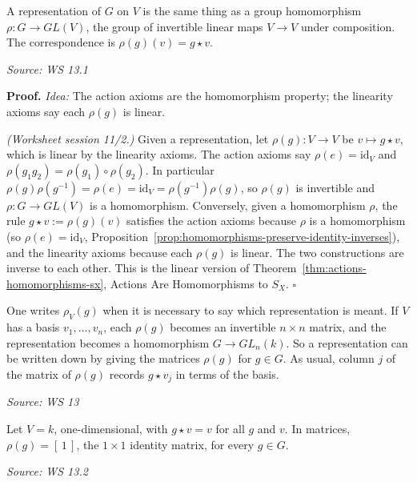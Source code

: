 \documentclass[11pt]{report}
\renewenvironment{proof}[1][Proof]{\noindent\textbf{#1.} }{\hfill$\square$\par\vspace{5pt}}
\newcommand{\srcline}[1]{\par\hfill{\footnotesize\textit{Source: #1}}}
\begin{document}
\begin{propbox}\label{prop:representations-homomorphisms-glv}
A representation of $G$ on $V$ is the same thing as a group homomorphism $\rho: G \to GL(V)$, the group of invertible linear maps $V \to V$ under composition. The correspondence is $\rho(g)(v) = g \star v$.
\srcline{WS 13.1}
\end{propbox}

\begin{proof}
\textit{Idea:} The action axioms are the homomorphism property; the linearity axioms say each $\rho(g)$ is linear.\par
\textit{(Worksheet session 11/2.)} Given a representation, let $\rho(g): V \to V$ be $v \mapsto g \star v$, which is linear by the linearity axioms. The action axioms say $\rho(e) = \mathrm{id}_V$ and $\rho(g_1g_2) = \rho(g_1) \circ \rho(g_2)$. In particular $\rho(g)\rho(g^{-1}) = \rho(e) = \mathrm{id}_V = \rho(g^{-1})\rho(g)$, so $\rho(g)$ is invertible and $\rho: G \to GL(V)$ is a homomorphism. Conversely, given a homomorphism $\rho$, the rule $g \star v := \rho(g)(v)$ satisfies the action axioms because $\rho$ is a homomorphism (so $\rho(e) = \mathrm{id}_V$, Proposition~\ref{prop:homomorphisms-preserve-identity-inverses}), and the linearity axioms because each $\rho(g)$ is linear. The two constructions are inverse to each other. This is the linear version of Theorem~\ref{thm:actions-homomorphisms-sx}, Actions Are Homomorphisms to $S_X$.
\end{proof}

\begin{rembox}\label{rem:representation-matrices}
One writes $\rho_V(g)$ when it is necessary to say which representation is meant. If $V$ has a basis $v_1, \ldots, v_n$, each $\rho(g)$ becomes an invertible $n \times n$ matrix, and the representation becomes a homomorphism $G \to GL_n(k)$. So a representation can be written down by giving the matrices $\rho(g)$ for $g \in G$. As usual, column $j$ of the matrix of $\rho(g)$ records $g \star v_j$ in terms of the basis.
\srcline{WS 13}
\end{rembox}

\begin{exbox}\label{ex:trivial-representation}
Let $V = k$, one-dimensional, with $g \star v = v$ for all $g$ and $v$. In matrices, $\rho(g) = [\,1\,]$, the $1 \times 1$ identity matrix, for every $g \in G$.
\srcline{WS 13.2}
\end{exbox}
\end{document}

